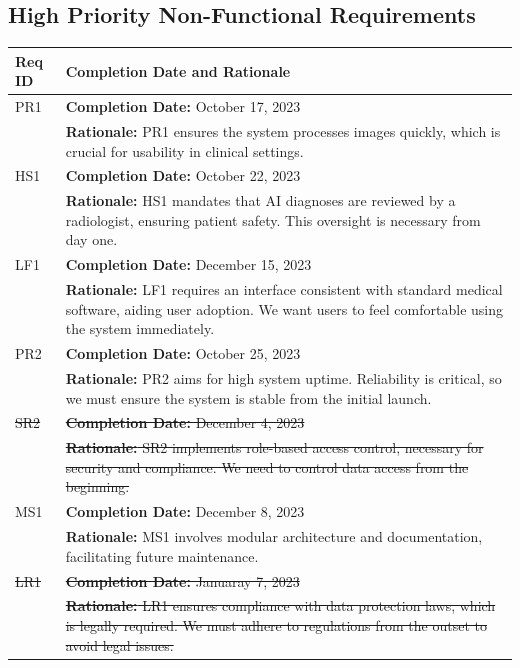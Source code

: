 \documentclass[12pt]{article}
\begin{document}
\subsection{High Priority Non-Functional Requirements}
\begin{table}[H]
  \label{TblHighPriorityNFRs}
  \begin{tabular}{p{}|p{}}
  \toprule
  \textbf{Req ID} & \textbf{Completion Date and Rationale} \\
  \midrule
  PR1 & \textbf{Completion Date:} October 17, 2023\\
      & \textbf{Rationale:} PR1 ensures the system processes images quickly, which is crucial for usability in clinical settings. \\
  \midrule
  HS1 & \textbf{Completion Date:} October 22, 2023\\
      & \textbf{Rationale:} HS1 mandates that AI diagnoses are reviewed by a radiologist, ensuring patient safety. This oversight is necessary from day one. \\
  \midrule
  LF1 & \textbf{Completion Date:} December 15, 2023\\
      & \textbf{Rationale:} LF1 requires an interface consistent with standard medical software, aiding user adoption. We want users to feel comfortable using the system immediately. \\
  \midrule
  PR2 & \textbf{Completion Date:} October 25, 2023\\
      & \textbf{Rationale:} PR2 aims for high system uptime. Reliability is critical, so we must ensure the system is stable from the initial launch. \\
  \midrule
  \sout{SR2} & \sout{\textbf{Completion Date:} December 4, 2023}\\
      & \sout{\textbf{Rationale:} SR2 implements role-based access control, necessary for security and compliance. We need to control data access from the beginning.} \\
  \midrule
  MS1 & \textbf{Completion Date:} December 8, 2023\\
      & \textbf{Rationale:} MS1 involves modular architecture and documentation, facilitating future maintenance. \\
  \midrule
  \sout{LR1} & \sout{\textbf{Completion Date:} Januaray 7, 2023}\\
      & \sout{\textbf{Rationale:} LR1 ensures compliance with data protection laws, which is legally required. We must adhere to regulations from the outset to avoid legal issues.} \\

\end{tabular}
\end{table}
\end{document}
